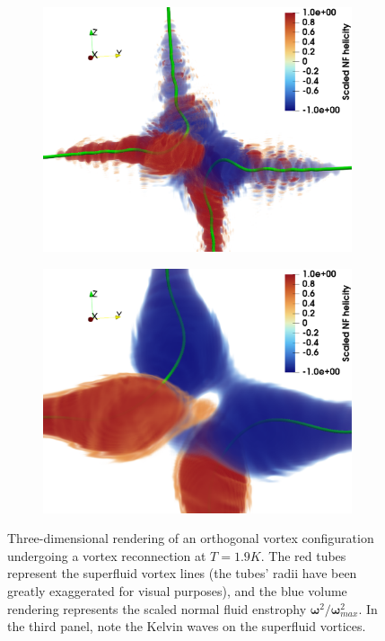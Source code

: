 \documentclass[%
 reprint,
 amsmath,amssymb,
 aps,
 prl,
]{revtex4-2}
\newcommand{\bom}{\boldsymbol{\omega}}
\begin{document}
\begin{figure}
\begin{subfigure}[b]{0.24\textwidth}
		\includegraphics*[width=\textwidth]{snaps-hel-3.pdf}
	\end{subfigure}
    \begin{subfigure}[b]{0.24\textwidth}
		\centering
		\includegraphics*[width=\textwidth]{snaps-hel-4.pdf}
	\end{subfigure} \hfill
	\caption{Three-dimensional rendering of an orthogonal vortex configuration 
undergoing a vortex reconnection at $T=1.9K$. The red tubes represent
the superfluid vortex
lines (the tubes' radii have been greatly exaggerated for visual purposes), 
and the blue volume rendering represents the scaled normal fluid enstrophy 
$\bom^2/\bom^2_{max}$. In the third panel, note the Kelvin waves on the superfluid vortices.}
    \label{fig:visualisation}
\end{figure}
\end{document}
